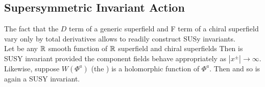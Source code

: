 \documentclass{article}
\begin{document}
\subsection{Supersymmetric Invariant Action}
The fact that the $D$ term of a generic superfield and F term of a chiral superfield vary only by total derivatives allows to readily construct SUSy invariants. \\
Let 
be any $\mathbb{R}$ smooth  function of $\mathbb{R}$ superfield
and chiral superfields 
Then
is SUSY invariant provided the component fields behave appropriately as $|x^\pm|\to \infty$. Likewise, suppose $W(\Phi^a)$ (the ) is a holomorphic function of $\Phi^a$. Then 
and so  
is again a SUSY invariant. 
\end{document}
